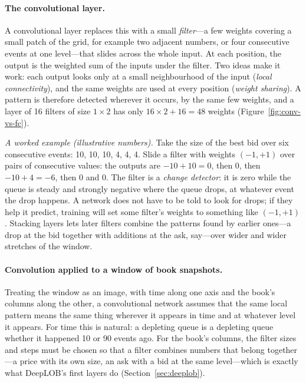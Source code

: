 \paragraph{The convolutional layer.} A convolutional layer replaces this with a small
\emph{filter}---a few weights covering a small patch of the grid, for example two adjacent numbers, or four
consecutive events at one level---that slides across the whole input. At each position, the output is the
weighted sum of the inputs under the filter. Two ideas make it work: each output looks only at a small neighbourhood
of the input (\emph{local connectivity}), and the same weights are used at every position (\emph{weight sharing}).
A pattern is therefore detected wherever it occurs, by the same few weights, and a layer of 16 filters of size
$1 \times 2$ has only $16 \times 2 + 16 = 48$ weights (Figure~\ref{fig:conv-vs-fc}).

\textit{A worked example (illustrative numbers).} Take the size of the best bid over six consecutive events: 10, 10,
10, 4, 4, 4. Slide a filter with weights $(-1, +1)$ over pairs of consecutive values: the outputs are
$-10 + 10 = 0$, then 0, then $-10 + 4 = -6$, then 0 and 0. The filter is a \emph{change detector}: it is zero while
the queue is steady and strongly negative where the queue drops, at whatever event the drop happens. A network does
not have to be told to look for drops; if they help it predict, training will set some filter's weights to
something like $(-1, +1)$. Stacking layers lets later filters combine the patterns found by earlier ones---a drop at
the bid together with additions at the ask, say---over wider and wider stretches of the window.

\paragraph{Convolution applied to a window of book snapshots.} Treating the window as an image, with time along one axis and the
book's columns along the other, a convolutional network assumes that the same local pattern means the same thing
wherever it appears in time and at whatever level it appears. For time this is natural: a depleting queue is a
depleting queue whether it happened 10 or 90 events ago. For the book's columns, the filter sizes and steps must be
chosen so that a filter combines numbers that belong together---a price with its own size, an ask with a bid at the
same level---which is exactly what DeepLOB's first layers do (Section~\ref{sec:deeplob}).

